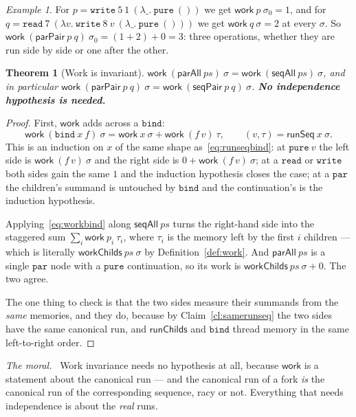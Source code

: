 \documentclass[11pt,a4paper]{article}
\theoremstyle{definition}
\theoremstyle{plain}
\newtheorem{theorem}[definition]{Theorem}
\theoremstyle{remark}
\newtheorem{example}[definition]{Example}
\newenvironment{moral}{\par\medskip\noindent\textit{The moral.}\ \ignorespaces}{\par\medskip}
\newcommand{\st}{\sigma}
\newcommand{\runSeq}{\mathsf{runSeq}}
\newcommand{\work}{\mathsf{work}}
\begin{document}
\begin{example}
For $p = \texttt{write}\ 5\ 1\ (\lambda\_.\ \texttt{pure}\ ())$ we get $\work\ p\ \st_0 = 1$,
and for $q = \texttt{read}\ 7\ (\lambda v.\ \texttt{write}\ 8\ v\ (\lambda\_.\ \texttt{pure}\ ()))$
we get $\work\ q\ \st = 2$ at every $\st$. So
$\work\ (\mathsf{parPair}\ p\ q)\ \st_0 = (1 + 2) + 0 = 3$: three operations, whether they are
run side by side or one after the other.
\end{example}

\begin{theorem}[Work is invariant]\label{thm:workeq}
$\work\ (\mathsf{parAll}\ ps)\ \st = \work\ (\mathsf{seqAll}\ ps)\ \st$, and in particular
$\work\ (\mathsf{parPair}\ p\ q)\ \st = \work\ (\mathsf{seqPair}\ p\ q)\ \st$. \textbf{No
independence hypothesis is needed.}
\end{theorem}

\begin{proof}
First, $\work$ adds across a $\texttt{bind}$:
\begin{equation}
  \work\ (\texttt{bind}\ x\ f)\ \st = \work\ x\ \st + \work\ (f\,v)\ \tau,
  \qquad (v,\tau) = \runSeq\ x\ \st . \label{eq:workbind}
\end{equation}
This is an induction on $x$ of the same shape as~\eqref{eq:runseqbind}: at
$\texttt{pure}\ v$ the left side is $\work\ (f\,v)\ \st$ and the right side is
$0 + \work\ (f\,v)\ \st$; at a $\texttt{read}$ or $\texttt{write}$ both sides gain the same
$1$ and the induction hypothesis closes the case; at a $\texttt{par}$ the children's summand
is untouched by $\texttt{bind}$ and the continuation's is the induction hypothesis.

Applying~\eqref{eq:workbind} along $\mathsf{seqAll}\ ps$ turns the right-hand side into the
staggered sum $\sum_i \work\ p_i\ \tau_i$, where $\tau_i$ is the memory left by the first $i$
children --- which is literally $\mathsf{workChilds}\ ps\ \st$ by
Definition~\ref{def:work}. And $\mathsf{parAll}\ ps$ is a single $\texttt{par}$ node with a
$\texttt{pure}$ continuation, so its work is $\mathsf{workChilds}\ ps\ \st + 0$. The two
agree.

The one thing to check is that the two sides measure their summands from the \emph{same}
memories, and they do, because by Claim~\ref{cl:samerunseq} the two sides have the same
canonical run, and $\mathsf{runChilds}$ and $\texttt{bind}$ thread memory in the same
left-to-right order.
\end{proof}

\begin{moral}
Work invariance needs no hypothesis at all, because $\work$ is a statement about the canonical
run --- and the canonical run of a fork \emph{is} the canonical run of the corresponding
sequence, racy or not. Everything that needs independence is about the \emph{real} runs.
\end{moral}
\end{document}
